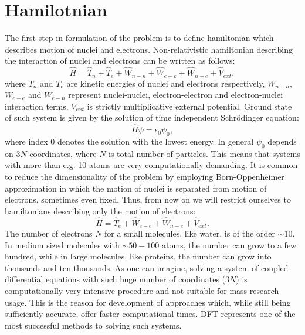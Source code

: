 \documentclass[openany, longbibliography,slovene,a4paper,12pt]{article}
\begin{document}
\section{Hamilotnian}
The first step in formulation of the problem is to define hamiltonian which
describes motion of nuclei and electrons. Non-relativistic hamiltonian
describing the interaction of  nuclei and electrons can be written as follows:
\begin{equation} \label{full_hamiltonian}
\hat H= \hat T_n + \hat  T_e + \hat  W_{n-n} + \hat W_{e-e} + \hat W_{n-e} + \hat V_{ext},
\end{equation}
where $T_n$ and $T_e$ are kinetic energies of nuclei and electrons respectively,
$W_{n-n}$, $W_{e-e}$ and $W_{e-n}$ represent  nuclei-nuclei, electron-electron
and electron-nuclei interaction terms. $V_{ext}$ is strictly multiplicative external potential. Ground state of such system is given by the solution of time independent Schr{\"o}dinger equation:
\begin{equation} \label{ham_solution}
\hat H \psi = \epsilon_0 \psi_0,
\end{equation} 
where index $0$ denotes the solution with the lowest energy. In general $\psi_0$
depends on $3N$ coordinates, where $N$ is total number of particles. This means
that systems with more than e.g. 10 atoms are very computationally
demanding. It is common to reduce the dimensionality of the problem by employing
Born-Oppenheimer approximation in which the motion of nuclei is separated from
motion of electrons, sometimes even fixed. Thus, from now on we will restrict
ourselves to hamiltonians describing only the motion of electrons:
\begin{equation} \label{electron_hamiltonian}
\hat H=  \hat  T_e  + \hat W_{e-e} + \hat W_{n-e} + \hat V_{ext}.
\end{equation}
The number of electrons $N$ for a small molecules, like water, is of the order $\sim
10$. In medium sized molecules with $\sim 50-100$ atoms, the number can grow to a few
hundred, while in large molecules, like proteins, the number can grow into
thousands and ten-thousands. As one can imagine, solving a system of coupled differential equations
with such huge number of coordinates ($3N$) is computationally very intensive
procedure and not suitable for mass research usage.
This is the reason for development of approaches which, while still being
sufficiently accurate, offer faster computational times. DFT represents one of
the most successful methods to solving such systems.
\end{document}
